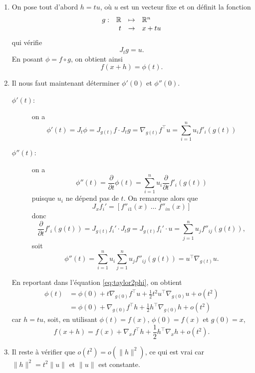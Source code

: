   \begin{enumerate}
    \item On pose tout d'abord $h = t u$, où $u$ est un vecteur fixe et on définit la fonction 
    $$
      \begin{array}{rrcl}
        g : & \mathbb{R} & \mapsto & \mathbb{R}^n \\
        & t & \to & x + t u
      \end{array}
    $$
    qui vérifie
    $$
    J_t g = u.
    $$
    En posant $\phi = f \circ g$, on obtient ainsi
    $$
    f(x + h) = \phi(t).
    $$
    \item Il nous faut maintenant déterminer $\phi'(0)$ et $\phi''(0)$.
    \begin{description}
      \item[$\phi'(t)$:] on a
        $$
        \phi'(t) = J_t \phi 
        = J_{g(t)} f \cdot J_t g
        = \nabla_{g(t)}f^\top u
        = \sum_{i=1}^n u_i f'_i(g(t))
        $$
      \item[$\phi''(t)$:] on a
      $$
      \phi''(t) 
      = \frac{\partial}{\partial t} \phi(t)
      = \sum_{i=1}^n u_i \frac{\partial}{\partial t} f'_i(g(t))
      $$
      puisque $u_i$ ne dépend pas de $t$. On remarque alors que
      $$
      J_x f_i' = [f''_{i1}(x) \; \dots \; f''_{in}(x)]
      $$
      donc
      $$
      \frac{\partial}{\partial t} f'_i(g(t)) 
      = J_{g(t)} f_i' \cdot J_t g
      = J_{g(t)} f_i' \cdot u
      = \sum_{j=1}^n u_j f''_{ij}(g(t)),
      $$
      soit
      $$
      \phi''(t) 
      = \sum_{i=1}^n u_i \sum_{j=1}^n u_j f''_{ij}(g(t))
      = u^\top \nabla_{g(t)} u.
      $$
    \end{description}
    En reportant dans l'équation \eqref{eq:taylor2phi}, on obtient
    \begin{align*}
      \phi(t) 
      & = \phi(0) + t \nabla_{g(0)}f^\top u + \frac12 t^2 u^\top \nabla_{g(0)} u + o(t^2) \\
      & = \phi(0) + \nabla_{g(0)}f^\top h + \frac12 h^\top \nabla_{g(0)} h + o(t^2)
    \end{align*}
    car $h = tu$, soit, en utilisant $\phi(t) = f(x)$, $\phi(0) = f(x)$ et $g(0) = x$,
    $$
    f(x+h) 
    = f(x) + \nabla_{x}f^\top h + \frac12 h^\top \nabla_{x} h + o(t^2).
    $$
    \item Il reste à vérifier que $o(t^2) = o(\|h\|^2)$, ce qui est vrai car $\|h\|^2 = t^2 \|u\|$ et $\|u\|$ est constante.
  \end{enumerate}
\eproof

